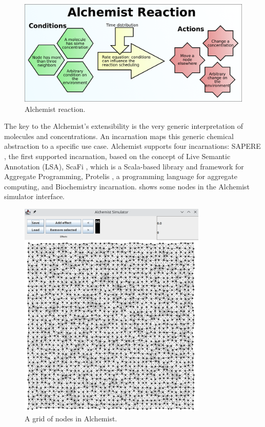 \documentclass[12pt,a4paper,openright,twoside]{book}
\begin{document}
\begin{figure}[h!]
  \centering
  \includegraphics[width=\textwidth]{figures/alchemist-reaction.png}
  \caption{Alchemist reaction.}
  \label{fig:alchemist-reaction}
\end{figure}

The key to the Alchemist's extensibility is the very generic interpretation of molecules and concentrations. An incarnation maps this generic chemical abstraction to a specific use case.
Alchemist supports four incarnations:
SAPERE \cite{DBLP:conf/saso/CastelliMRZ11}, the first supported incarnation, based on the concept of Live Semantic Annotation (LSA),
ScaFi \cite{DBLP:journals/softx/CasadeiVAP22}, which is a Scala-based library and framework for Aggregate Programming,
Protelis \cite{DBLP:conf/sac/PianiniVB15}, a programming language for aggregate computing, and
Biochemistry incarnation.
 shows some nodes in the Alchemist simulator interface.

\begin{figure}[h!]
  \centering
  \includegraphics[width=0.8\textwidth]{figures/alchemist.png}
  \caption{A grid of nodes in Alchemist.}
  \label{fig:alchemist-nodes}
\end{figure}
\end{document}
